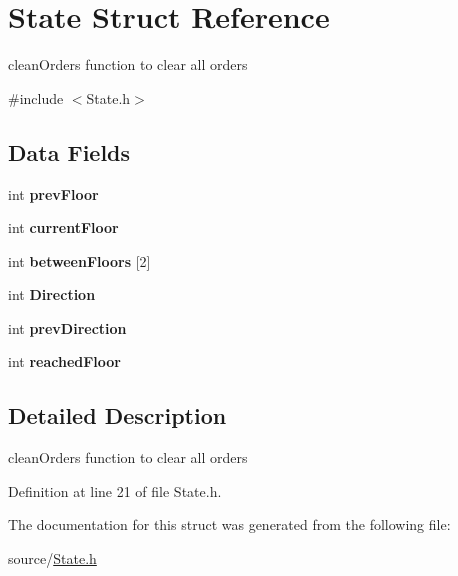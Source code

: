 \hypertarget{structState}{}\section{State Struct Reference}
\label{structState}


clean\+Orders function to clear all orders  




{\ttfamily \#include $<$State.\+h$>$}

\subsection*{Data Fields}
\begin{DoxyCompactItemize}
\item 
\mbox{\label{structState_a9a4974e82bc7b99af7715b3189487a31}} 
int {\bfseries prev\+Floor}
\item 
\mbox{\label{structState_a4cd2ebda127f8b9823eba7c826b10a75}} 
int {\bfseries current\+Floor}
\item 
\mbox{\label{structState_a3b31c590da55414522eff4e78446a16a}} 
int {\bfseries between\+Floors} \mbox{[}2\mbox{]}
\item 
\mbox{\label{structState_a832d2d78380f35e196d9d5852745e443}} 
int {\bfseries Direction}
\item 
\mbox{\label{structState_a43387fbee52a7c410724b9e11c07de4c}} 
int {\bfseries prev\+Direction}
\item 
\mbox{\label{structState_a6fa44c270fd2f9880649db7c26aec6da}} 
int {\bfseries reached\+Floor}
\end{DoxyCompactItemize}


\subsection{Detailed Description}
clean\+Orders function to clear all orders 

Definition at line 21 of file State.\+h.



The documentation for this struct was generated from the following file\+:\begin{DoxyCompactItemize}
\item 
source/\hyperlink{State_8h}{State.\+h}\end{DoxyCompactItemize}
